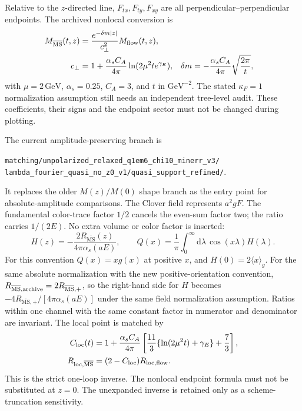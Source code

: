 \documentclass[11pt]{article}
\numberwithin{equation}{section}
\newcommand{\dd}{\mathrm{d}}
\newcommand{\MSbar}{\overline{\mathrm{MS}}}
\begin{document}
Relative to the \(z\)-directed line, \(F_{tx},F_{ty},F_{xy}\) are all
perpendicular--perpendicular endpoints. The archived nonlocal conversion is
\begin{align}
 M_{\MSbar}(t,z)&=\frac{e^{-\delta m|z|}}{c_\perp^2}M_{\rm flow}(t,z),\\
 c_\perp&=1+\frac{\alpha_s C_A}{4\pi}\ln(2\mu^2te^{\gamma_E}),&
 \delta m&=-\frac{\alpha_s C_A}{4\pi}\sqrt{\frac{2\pi}{t}},
 \label{eq:october-gluon-conversion}
\end{align}
with \(\mu=2\,\mathrm{GeV}\), \(\alpha_s=0.25\), \(C_A=3\),
and \(t\) in \(\mathrm{GeV}^{-2}\).
The stated \(\kappa_F=1\) normalization assumption still needs an
independent tree-level audit. These coefficients, their signs and the
endpoint sector must not be changed during plotting.

The current amplitude-preserving branch is
\begin{center}
\nolinkurl{matching/unpolarized_relaxed_q1em6_chi10_minerr_v3/}\\
\nolinkurl{lambda_fourier_quasi_no_z0_v1/quasi_support_refined/}.
\end{center}
It replaces the older \(M(z)/M(0)\) shape branch as the entry point for
absolute-amplitude comparisons. The Clover field represents \(a^2gF\).
The fundamental color-trace factor \(1/2\) cancels the even-sum factor two;
the ratio carries \(1/(2E)\). No extra volume or color factor is inserted:
\begin{equation}
 H(z)=-\frac{2R_{\MSbar}(z)}{4\pi\alpha_s(aE)},\qquad
 Q(x)=\frac1\pi\int_0^\infty\dd\lambda\,
                          \cos(x\lambda)H(\lambda).
 \label{eq:october-gluon-normalization}
\end{equation}
For this convention \(Q(x)=xg(x)\) at positive \(x\), and
\(H(0)=2\langle x\rangle_g\).  For the same absolute normalization with
the new positive-orientation convention,
\(R_{\MSbar,\rm archive}=2R_{\MSbar,+}\), so the right-hand side for \(H\)
becomes \(-4R_{\MSbar,+}/[4\pi\alpha_s(aE)]\) under the same field normalization
assumption.  Ratios within one channel with the same constant factor in
numerator and denominator are invariant.  The local point is matched by
\begin{align}
 C_{\rm loc}(t)&=1+\frac{\alpha_sC_A}{4\pi}
 \left[\frac{11}{3}\{\ln(2\mu^2t)+\gamma_E\}+\frac73\right],\\
 R_{{\rm loc},\MSbar}&=(2-C_{\rm loc})R_{{\rm loc},{\rm flow}} .
\end{align}
This is the strict one-loop inverse. The nonlocal endpoint formula must
not be substituted at \(z=0\). The unexpanded inverse is retained only
as a scheme-truncation sensitivity.
\end{document}

